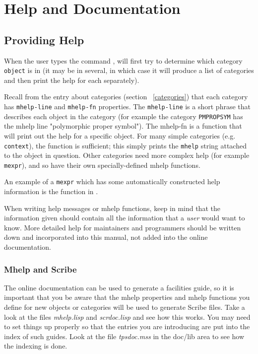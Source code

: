 \chapter{Help and Documentation}
\label{help}

\section{Providing Help}

When the user types the command , \TPS will first
try to determine which category {\tt object} is in (it may be in several, in which case it will 
produce a list of categories and then print the help for each separately).

Recall from the entry about categories (section ~\ref{categories}) that each category has 
{\tt mhelp-line} and {\tt mhelp-fn} properties. The {\tt mhelp-line} is a short phrase that describes 
each object in the category (for example the category {\tt PMPROPSYM} has the mhelp line 
"polymorphic proper symbol"). The mhelp-fn is a function that will print out the help for a specific
object. For many simple categories (e.g. {\tt context}), 
the function {\tt {}} is sufficient; this simply 
prints the {\tt mhelp} string attached to the object in question. Other categories need more complex
help (for example {\tt mexpr}), and so have their own specially-defined mhelp functions.

An example of a {\tt mexpr} which has some automatically constructed help information
is the function  in .

When writing help messages or mhelp functions, keep in mind that the information given 
should contain all the information that a {\it user} would want to know. 
More detailed help for maintainers and programmers should 
be written down and incorporated into this manual, not added into the online documentation.

\subsection{Mhelp and Scribe}
The online documentation can be used to generate a facilities guide, so
it is important that you be aware that the mhelp properties and mhelp functions
you define for new objects or categories will be used to generate Scribe
files.  Take a look at the files {\it mhelp.lisp} and {\it scrdoc.lisp} and see
how this works.  You may need to set things up properly so that the entries you
are introducing are put into the index of such guides.  Look at the
file {\it tpsdoc.mss} in the doc/lib area to see how the indexing is done.

